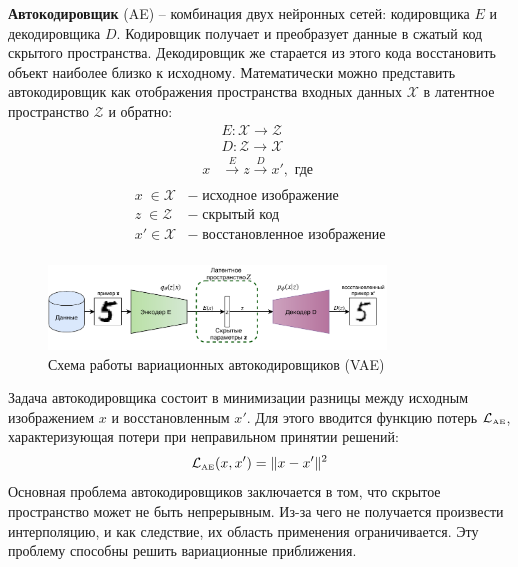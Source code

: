 \documentclass[11pt,a4paper]{extarticle}
\begin{document}
		\textbf{Автокодировщик} (AE) -- комбинация двух нейронных сетей: кодировщика $E$ и декодировщика $D$.
		Кодировщик получает и преобразует данные в сжатый код скрытого пространства.
		Декодировщик же старается из этого кода восстановить объект наиболее близко к исходному.
		Математически можно представить автокодировщик как отображения пространства входных данных $\mathcal{X}$ в латентное пространство $\mathcal{Z}$ и обратно:
		\begin{equation}
			\begin{aligned} 
				& E\!:{\mathcal{X}}\rightarrow {\mathcal{Z}} \\
				& D\!:{\mathcal{Z}}\rightarrow {\mathcal{X}} \\
				x& \xrightarrow[]{E} z \xrightarrow[]{D} x', \text{ где }
			\end{aligned}
		\end{equation}
		\begin{equation*}
			\begin{array}{ll}
				x\;\in \mathcal{X}&-\;\text{исходное изображение}\\
				z\;\in \mathcal{Z}&-\;\text{скрытый код}\\
				x' \in \mathcal{X}&-\;\text{восстановленное изображение}\\
			\end{array} 
		\end{equation*}

		\begin{figure}[ht]
			\centering
			\includegraphics[width=0.8\textwidth]{img/vae}
			\caption{Схема работы вариационных автокодировщиков (VAE)}
			\label{pic:vae}
		\end{figure}
		\noindent
		Задача автокодировщика состоит в минимизации разницы между исходным изображением $x$ и восстановленным $x'$.
		Для этого вводится функцию потерь $\mathcal{L}_{\text{\tiny AE}}$, характеризующая потери при неправильном принятии решений:
		\begin{equation} \label{eq:ae}
			\mathcal{L}_{\text{\tiny AE}}(x,x') = \|x - x'\|^{2}
		\end{equation}
		Основная проблема автокодировщиков заключается в том, что скрытое пространство может не быть непрерывным.
		Из-за чего не получается произвести интерполяцию, и как следствие, их область применения ограничивается.
		Эту проблему способны решить вариационные приближения.
\end{document}
